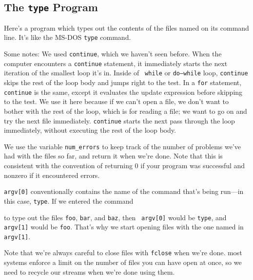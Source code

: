 \subsection{The {\tt type} Program}

Here's a program which types out the contents of the files named on its
command line.  It's like the MS-DOS {\tt type} command.



Some notes: We used {\tt continue}, which we haven't seen before.  When
the computer encounters a {\tt continue} statement, it immediately
starts the next iteration of the smallest loop it's in.  Inside of {\tt
while} or {\tt do{\rm--}while} loop, {\tt continue} skips the rest of
the loop body and jumps right to the test.  In a {\tt for} statement,
{\tt continue} is the same, except it evaluates the update expression
before skipping to the test.  We use it here because if we can't open a
file, we don't want to bother with the rest of the loop, which is for
reading a file; we want to go on and try the next file immediately.
{\tt continue} starts the next pass through the loop immediately,
without executing the rest of the loop body.

We use the variable {\tt num\_errors} to keep track of the number of
problems we've had with the files so far, and return it when we're done.
Note that this is consistent with the convention of returning 0 if your
program was successful and nonzero if it encountered errors.  

{\tt argv[0]} conventionally contains the name of the command
that's being run---in this case, {\tt type}.  If we entered the command 
\begin{flushleft}
\verb% type foo bar baz% \\*
\end{flushleft}

\noindent to type out the files {\tt foo}, {\tt bar}, and {\tt baz}, then {\tt
argv[0]} would be {\tt type}, and {\tt argv[1]} would be {\tt foo}.
That's why we start opening files with the one named in {\tt argv[1]}.

Note that we're always careful to close files with {\tt fclose} when
we're done.  most systems enforce a limit on the number of files you can
have open at once, so we need to recycle our streams when we're done
using them.  


